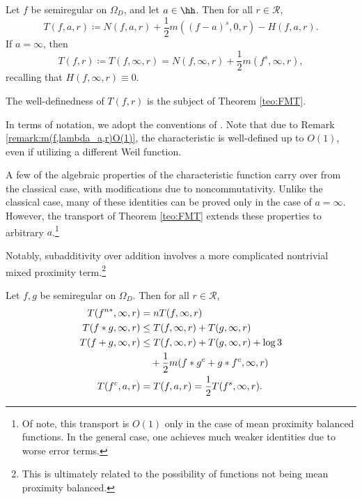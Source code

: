 \documentclass{amsart}
\begin{document}
\begin{defin}\label{def:characteristic}
    Let $f$ be semiregular on $\Omega_D$, and let $a\in\hh$. Then for all $r\in \mathcal{R}$, \[T(f,a,r)\coloneq N(f,a,r)+\frac{1}{2}m((f-a)^s, 0, r)-H(f,a,r).\] If $a=\infty$, then \[T(f,r)\coloneq T(f,\infty,r)= N(f,\infty, r)+\frac{1}{2}m(f^s,\infty,r),\] recalling that $H(f,\infty,r)\equiv 0$. 
\end{defin}

The well-definedness of $T(f,r)$ is the subject of Theorem \ref{teo:FMT}.  

In terms of notation, we adopt the conventions of \cite{cherry2001nevanlinna}. Note that due to Remark \ref{remark:m(f,lambda_a,r)O(1)}, the characteristic is well-defined up to $O(1)$, even if utilizing a different Weil function. 

A few of the algebraic properties of the characteristic function carry over from the classical case, with modifications due to noncommutativity. Unlike the classical case, many of these identities can be proved only in the case of $a=\infty$. However, the transport of Theorem \ref{teo:FMT} extends these properties to arbitrary $a$.\footnote{Of note, this transport is $O(1)$ only in the case of mean proximity balanced functions. In the general case, one achieves much weaker identities due to worse error terms.}

Notably, subadditivity over addition involves a more complicated nontrivial mixed proximity term.\footnote{This is ultimately related to the possibility of functions not being mean proximity balanced.}

\begin{prop}\label{prop:CharacteristicAlgera}
    Let $f,g$ be semiregular on $\Omega_D$. 
Then for all $r\in\mathcal R$,
\begin{align}
    T(f^{n*},\infty,r)&=nT(f,\infty,r) \label{eq:1CharacteristicAlgera}\\
    T(f*g,\infty,r) &\leq T(f,\infty,r)+T(g,\infty,r)  \label{eq:2CharacteristicAlgera}\\ 
    T(f+g,\infty,r)&\leq T(f,\infty,r)+T(g,\infty,r)+\log 3 \label{eq:3CharacteristicAlgera}\\
    &\quad +\frac{1}{2}m(f*g^c+g*f^c,\infty, r) \notag\\
    T(f^c,a,r)&=T(f,a,r) = \frac{1}{2}T(f^s,\infty,r). \label{eq:4CharacteristicAlgera}
  \end{align}
\end{prop}
\end{document}
